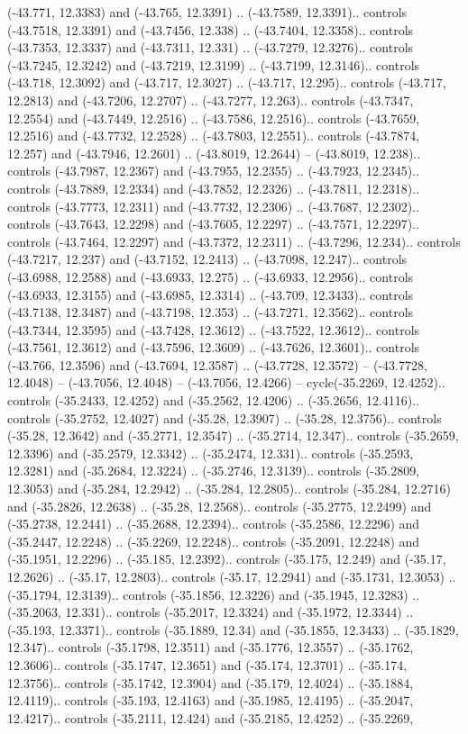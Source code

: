 \begin{scope}[shift={(2.5552, 9.9912)}]
\begin{scope}[shift={(48.1654, -14.8546)}]
(-43.771, 12.3383) and (-43.765, 12.3391) .. (-43.7589, 12.3391).. controls (-43.7518, 12.3391) and (-43.7456, 12.338) .. (-43.7404, 12.3358).. controls (-43.7353, 12.3337) and (-43.7311, 12.331) .. (-43.7279, 12.3276).. controls (-43.7245, 12.3242) and (-43.7219, 12.3199) .. (-43.7199, 12.3146).. controls (-43.718, 12.3092) and (-43.717, 12.3027) .. (-43.717, 12.295).. controls (-43.717, 12.2813) and (-43.7206, 12.2707) .. (-43.7277, 12.263).. controls (-43.7347, 12.2554) and (-43.7449, 12.2516) .. (-43.7586, 12.2516).. controls (-43.7659, 12.2516) and (-43.7732, 12.2528) .. (-43.7803, 12.2551).. controls (-43.7874, 12.257) and (-43.7946, 12.2601) .. (-43.8019, 12.2644) -- (-43.8019, 12.238).. controls (-43.7987, 12.2367) and (-43.7955, 12.2355) .. (-43.7923, 12.2345).. controls (-43.7889, 12.2334) and (-43.7852, 12.2326) .. (-43.7811, 12.2318).. controls (-43.7773, 12.2311) and (-43.7732, 12.2306) .. (-43.7687, 12.2302).. controls (-43.7643, 12.2298) and (-43.7605, 12.2297) .. (-43.7571, 12.2297).. controls (-43.7464, 12.2297) and (-43.7372, 12.2311) .. (-43.7296, 12.234).. controls (-43.7217, 12.237) and (-43.7152, 12.2413) .. (-43.7098, 12.247).. controls (-43.6988, 12.2588) and (-43.6933, 12.275) .. (-43.6933, 12.2956).. controls (-43.6933, 12.3155) and (-43.6985, 12.3314) .. (-43.709, 12.3433).. controls (-43.7138, 12.3487) and (-43.7198, 12.353) .. (-43.7271, 12.3562).. controls (-43.7344, 12.3595) and (-43.7428, 12.3612) .. (-43.7522, 12.3612).. controls (-43.7561, 12.3612) and (-43.7596, 12.3609) .. (-43.7626, 12.3601).. controls (-43.766, 12.3596) and (-43.7694, 12.3587) .. (-43.7728, 12.3572) -- (-43.7728, 12.4048) -- (-43.7056, 12.4048) -- (-43.7056, 12.4266) -- cycle(-35.2269, 12.4252).. controls (-35.2433, 12.4252) and (-35.2562, 12.4206) .. (-35.2656, 12.4116).. controls (-35.2752, 12.4027) and (-35.28, 12.3907) .. (-35.28, 12.3756).. controls (-35.28, 12.3642) and (-35.2771, 12.3547) .. (-35.2714, 12.347).. controls (-35.2659, 12.3396) and (-35.2579, 12.3342) .. (-35.2474, 12.331).. controls (-35.2593, 12.3281) and (-35.2684, 12.3224) .. (-35.2746, 12.3139).. controls (-35.2809, 12.3053) and (-35.284, 12.2942) .. (-35.284, 12.2805).. controls (-35.284, 12.2716) and (-35.2826, 12.2638) .. (-35.28, 12.2568).. controls (-35.2775, 12.2499) and (-35.2738, 12.2441) .. (-35.2688, 12.2394).. controls (-35.2586, 12.2296) and (-35.2447, 12.2248) .. (-35.2269, 12.2248).. controls (-35.2091, 12.2248) and (-35.1951, 12.2296) .. (-35.185, 12.2392).. controls (-35.175, 12.249) and (-35.17, 12.2626) .. (-35.17, 12.2803).. controls (-35.17, 12.2941) and (-35.1731, 12.3053) .. (-35.1794, 12.3139).. controls (-35.1856, 12.3226) and (-35.1945, 12.3283) .. (-35.2063, 12.331).. controls (-35.2017, 12.3324) and (-35.1972, 12.3344) .. (-35.193, 12.3371).. controls (-35.1889, 12.34) and (-35.1855, 12.3433) .. (-35.1829, 12.347).. controls (-35.1798, 12.3511) and (-35.1776, 12.3557) .. (-35.1762, 12.3606).. controls (-35.1747, 12.3651) and (-35.174, 12.3701) .. (-35.174, 12.3756).. controls (-35.1742, 12.3904) and (-35.179, 12.4024) .. (-35.1884, 12.4119).. controls (-35.193, 12.4163) and (-35.1985, 12.4195) .. (-35.2047, 12.4217).. controls (-35.2111, 12.424) and (-35.2185, 12.4252) .. (-35.2269, 
\end{scope}
\end{scope}
